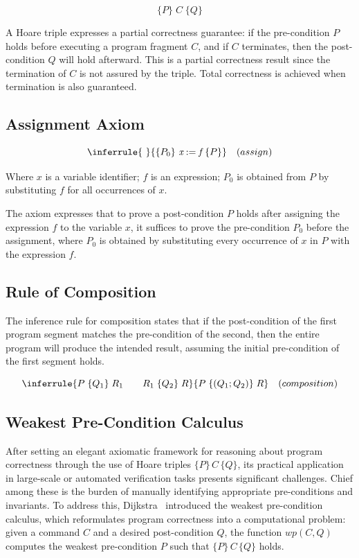 \[ 
  \{P\}\; C \;\{Q\}
\]

A Hoare triple expresses a partial correctness guarantee: if the pre-condition $P$ holds before executing a program fragment 
$C$, and if $C$ terminates, then the post-condition $Q$ will hold afterward. This is a partial correctness result since the 
termination of $C$ is not assured by the triple. Total correctness is achieved when termination is also guaranteed.

\subsection{Assignment Axiom}

\[ 
  \inferrule
  { \ }
  {\{P_0\} \ \textit{x} := \textit{f} \ \{P\}}
  \quad (assign)
\]

Where $x$ is a variable identifier; $f$ is an expression; $P_0$ is obtained from $P$ by substituting $f$ for all occurrences 
of $x$.

The axiom expresses that to prove a post-condition $P$ holds after assigning the expression $f$ to the variable $x$,
it suffices to prove the pre-condition $P_0$ before the assignment, where $P_0$ is obtained by substituting every occurrence of
$x$ in $P$ with the expression $f$.

\subsection{Rule of Composition}

The inference rule for composition states that if the post-condition of the first program segment matches the pre-condition 
of the second, then the entire program will produce the intended result, assuming the initial pre-condition of the first 
segment holds.

\[ 
  \inferrule
  {P\; \{ Q_1 \} \;R_1 \quad \quad  R_1\; \{ Q_2 \} \;R}
  {P\; \{ (Q_1 ; Q_2) \} \;R} 
  \quad (composition)
\]

\subsection{Weakest Pre-Condition Calculus}

After setting an elegant axiomatic framework for reasoning about program correctness through the use of Hoare triples 
$\{P\}\,C\,\{Q\}$, its practical application in large-scale or automated verification tasks presents significant challenges. 
Chief among these is the burden of manually identifying appropriate pre-conditions and invariants. To address this, 
Dijkstra~\cite{Dijkstra76} introduced the weakest pre-condition calculus, which reformulates program correctness into a computational 
problem: given a command $C$ and a desired post-condition $Q$, the function $wp(C,Q)$ computes the weakest pre-condition $P$ 
such that $\{P\}\,C\,\{Q\}$ holds.

